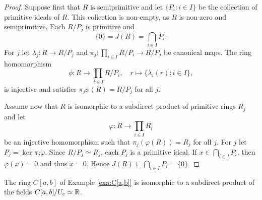 \begin{proof}
	Suppose first that $R$ is semiprimitive and let $\{P_i:i\in I\}$ be the collection of 
	primitive ideals of $R$. This collection is non-empty, as 
        $R$ is non-zero and semiprimitive. Each $R/P_j$ is primitive and 
	\[
 \{0\}=J(R)=\bigcap_{i\in I}P_i.
 \]
 For $j$ let $\lambda_j\colon R\to
	R/P_j$ and $\pi_j\colon \prod_{i\in I}R/P_i\to R/P_j$ be canonical maps. 
	The ring homomorphism 
	\[
		\phi\colon R\to\prod_{i\in I}R/P_i,\quad
		r\mapsto \{\lambda_i(r):i\in I\},
	\]
	is injective and satisfies $\pi_j\phi(R)=R/P_j$ for all 
	$j$.

	Assume now that $R$ is isomorphic to a subdirect product of primitive rings 
	$R_j$ and let 
    \[
    \varphi\colon R\to\prod_{i\in I}R_i
    \]
    be an injective homomorphism 
	such that $\pi_j(\varphi(R))=R_j$ for all $j$. For $j$ 
	let $P_j=\ker\pi_j\varphi$. Since $R/P_j\simeq R_j$, each $P_j$ is a primitive ideal. 
	If $x\in\bigcap_{i\in I}P_i$, then $\varphi(x)=0$ and thus $x=0$.
	Hence $J(R)\subseteq\bigcap_{i\in I} P_i=\{0\}$. 
\end{proof}


\begin{example}
	The ring $C[a,b]$ 
	of Example \ref{exa:C[a,b]}
	is isomorphic to a subdirect product of the fields 
	$C[a,b]/U_c\simeq\mathbb{R}$.
\end{example}


